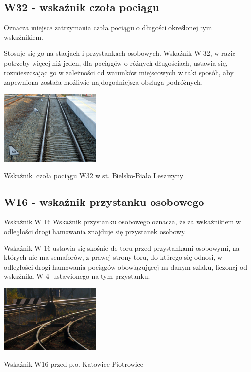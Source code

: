 \subsection{W32 - wskaźnik czoła pociągu}
\begin{tcolorbox}[colback=black!5!white,colframe=white!55!black,title=Wskaźnik W32]
Oznacza miejsce zatrzymania czoła pociągu o długości określonej tym wskaźnikiem.
\end{tcolorbox} Stosuje się go na stacjach i przystankach osobowych. Wskaźnik W 32, w razie potrzeby więcej niż jeden, dla pociągów o różnych długościach, ustawia się, rozmieszczając go w zależności od warunków miejscowych w taki sposób, aby zapewniona została możliwie
najdogodniejsza obsługa podróżnych.
	\begin{marginfigure}
		\includegraphics[width=5cm]{skryptkierownik-img/skryptkierownik-img007.jpg}
		\caption{Wskaźniki czoła pociągu W32 w st. Bielsko-Biała Leszczyny}
	\end{marginfigure}

\subsection{W16 - wskaźnik przystanku osobowego}
\begin{tcolorbox}[colback=black!5!white,colframe=white!55!black,title=Wskaźnik W16]
Wskaźnik W 16 {\textquotedbl}Wskaźnik przystanku osobowego{\textquotedbl} oznacza, że za wskaźnikiem w odległości drogi hamowania znajduje się przystanek osobowy.
\end{tcolorbox} Wskaźnik W 16 ustawia się skośnie do toru przed przystankami osobowymi, na których nie ma semaforów, z prawej strony toru, do którego się odnosi, w odległości drogi hamowania pociągów obowiązującej na danym szlaku, liczonej od wskaźnika W 4, ustawionego na tym przystanku.
	\begin{marginfigure}
		\includegraphics[width=5cm]{skryptkierownik-img/skryptkierownik-img008.jpg}
		\caption{Wskaźnik W16 przed p.o. Katowice Piotrowice}
	\end{marginfigure}


